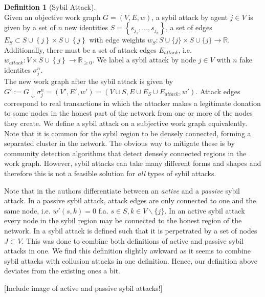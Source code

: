 \documentclass[11pt,a4paper]{report}
\theoremstyle{definition}
\newtheorem{definition}{Definition}[section]
\theoremstyle{theorem}
\theoremstyle{proposition}
\theoremstyle{corollary}
\theoremstyle{lemma}
\theoremstyle{example}
\theoremstyle{remark}
\begin{document}
\begin{definition}[Sybil Attack]\ \\
Given an objective work graph $G=(V,E,w)$, a sybil attack by agent $j\in{}V$ is given by a set of $n$ new identities $S=\left\lbrace{}s_{j_1},\ldots{},s_{j_n}\right\rbrace$, a set of edges $E_S\subset{}S\cup\left\lbrace{}j\right\rbrace\times{}S\cup\left\lbrace{}j\right\rbrace$ with edge weights $w_S:S\cup{}\{j\} \times S\cup{}\{j\}\rightarrow{}\mathbb{R}$. Additionally, there must be a set of attack edges $E_{attack}$, i.e. $w_{attack}:V\times{}S\cup\left\lbrace{}j\right\rbrace\rightarrow\mathbb{R}_{\geq{}0}$. We label a sybil attack by node $j\in{}V$ with $n$ fake identites $\sigma^n_j$. \vspace{1em}\\

\noindent{}The new work graph after the sybil attack is given by $G':=G\downarrow\sigma^n_j=(V',E',w')=(V\cup{}S,E\cup{}E_S\cup{}E_{attack},w')$. Attack edges correspond to real transactions in which the attacker makes a legitimate donation to some nodes in the honest part of the network from one or more of the nodes they create. We define a sybil attack on a subjective work graph equivalently. Note that it is common for the sybil region to be densely connected, forming a separated cluster in the network. The obvious way to mitigate these is by community detection algorithms that detect densely connected regions in the work graph. However, sybil attacks can take many different forms and shapes and therefore this is not a feasible solution for {\it all} types of sybil attacks. \vspace{1em}\\
\end{definition}

\noindent{}Note that in \cite{On the Sybil-Proofness of Accounting Mechanisms} the authors differentiate between an {\it active} and a {\it passive} sybil attack. In a passive sybil attack, attack edges are only connected to one and the same node, i.e. $w'(s,k)=0$ f.a. $s\in{}S,k\in{}V\backslash\lbrace{}j\rbrace$. In an active sybil attack every node in the sybil region may be connected to the honest region of the network. In \cite{Sybil-resistant Trust Mechanisms in Distributed Systems} a sybil attack is defined such that it is perpetrated by a set of nodes $J\subset{}V$. This was done to combine both definitions of active and passive sybil attacks in one. We find this definition slightly awkward as it seems to combine sybil attacks with collusion attacks in one definition. Hence, our definition above deviates from the existing ones a bit.\vspace{1em}\\ 
\begin{center}[Include image of active and passive sybil attacks!] \vspace{1em}\\ \end{center}
\end{document}
